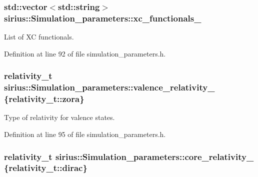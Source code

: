 \subsubsection[{xc\+\_\+functionals\+\_\+}]{\setlength{\rightskip}{0pt plus 5cm}std\+::vector$<$std\+::string$>$ sirius\+::\+Simulation\+\_\+parameters\+::xc\+\_\+functionals\+\_\+\hspace{0.3cm}{\ttfamily [protected]}}\label{classsirius_1_1_simulation__parameters_ab01a2e1c36f1d9ccd0e0d5baf62e689d}


List of X\+C functionals. 



Definition at line 92 of file simulation\+\_\+parameters.\+h.

\hypertarget{classsirius_1_1_simulation__parameters_a7cd6b301b7ab72a9c9ca7193eb018fc9}{}
\subsubsection[{valence\+\_\+relativity\+\_\+}]{\setlength{\rightskip}{0pt plus 5cm}relativity\+\_\+t sirius\+::\+Simulation\+\_\+parameters\+::valence\+\_\+relativity\+\_\+ \{relativity\+\_\+t\+::zora\}\hspace{0.3cm}{\ttfamily [protected]}}\label{classsirius_1_1_simulation__parameters_a7cd6b301b7ab72a9c9ca7193eb018fc9}


Type of relativity for valence states. 



Definition at line 95 of file simulation\+\_\+parameters.\+h.

\hypertarget{classsirius_1_1_simulation__parameters_ab54050138f051531ef2be6db38b41d66}{}
\subsubsection[{core\+\_\+relativity\+\_\+}]{\setlength{\rightskip}{0pt plus 5cm}relativity\+\_\+t sirius\+::\+Simulation\+\_\+parameters\+::core\+\_\+relativity\+\_\+ \{relativity\+\_\+t\+::dirac\}\hspace{0.3cm}{\ttfamily [protected]}}\label{classsirius_1_1_simulation__parameters_ab54050138f051531ef2be6db38b41d66}



